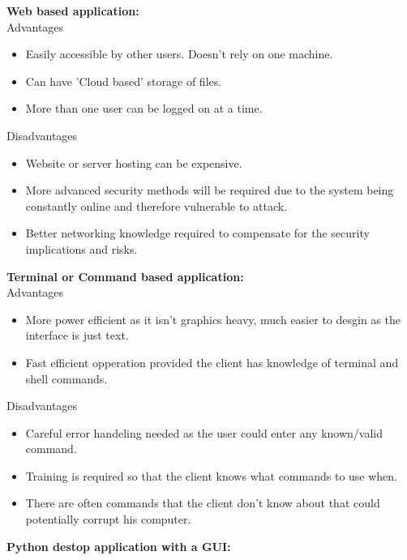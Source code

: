 \textbf{Web based application:}\\

Advantages
\begin{itemize}
    \item Easily accessible by other users. Doesn't rely on one machine.
    \item Can have 'Cloud based' storage of files.
    \item More than one user can be logged on at a time.
\end{itemize}

Disadvantages
\begin{itemize}
    \item Website or server hosting can be expensive.
    \item More advanced security methods will be required due to the system being constantly online and therefore vulnerable to attack.
    \item Better networking knowledge required to compensate for the security implications and risks.\\
\end{itemize}\hline

\newpage

\textbf{Terminal or Command based application:}\\

Advantages
\begin{itemize}
    \item More power efficient as it isn't graphics heavy, much easier to desgin as the interface is just text.
    \item Fast efficient opperation provided the client has knowledge of terminal and shell commands.
\end{itemize}

Disadvantages
\begin{itemize}
    \item Careful error handeling needed as the user could enter any known/valid command.
    \item Training is required so that the client knows what commands to use when.
    \item There are often commands that the client don't know about that could potentially corrupt his computer.\\
\end{itemize}\hline



\textbf{Python destop application with a GUI:}\\

